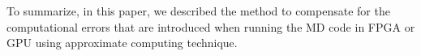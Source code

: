 To summarize, in this paper, we described the method to compensate for the computational errors that are introduced when running the MD code in FPGA or GPU using approximate computing technique.  
